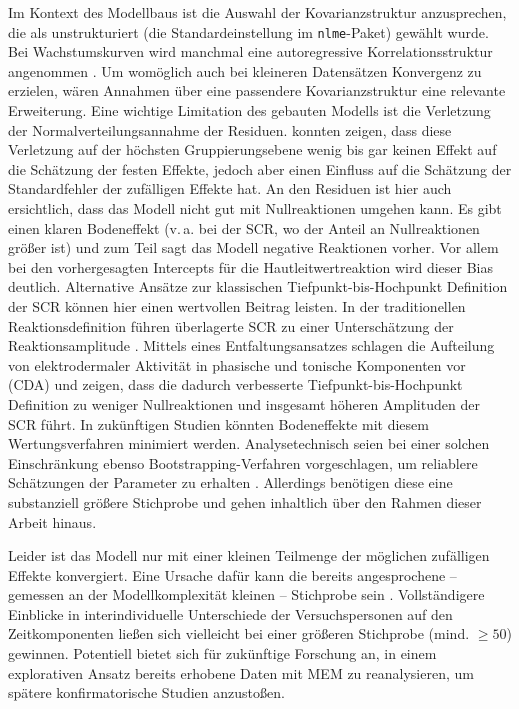 	Im Kontext des Modellbaus ist die Auswahl der Kovarianzstruktur anzusprechen, die als unstrukturiert (die Standardeinstellung im \texttt{nlme}-Paket) gewählt wurde. Bei Wachstumskurven wird manchmal eine autoregressive Korrelationsstruktur angenommen \parencite{BAGIELLA2000}. Um womöglich auch bei kleineren Datensätzen Konvergenz zu erzielen, wären Annahmen über eine passendere Kovarianzstruktur eine relevante Erweiterung.
	Eine wichtige Limitation des gebauten Modells ist die Verletzung der Normalverteilungsannahme der Residuen. %
	\textcite{MAAS2004} konnten zeigen, dass diese Verletzung auf der höchsten Gruppierungsebene wenig bis gar keinen Effekt auf die Schätzung der festen Effekte, jedoch aber einen Einfluss auf die Schätzung der Standardfehler der zufälligen Effekte hat.
	An den Residuen ist hier auch ersichtlich, dass das Modell nicht gut mit Nullreaktionen umgehen kann. Es gibt einen klaren Bodeneffekt (v.\,a. bei der SCR, wo der Anteil an Nullreaktionen größer ist) und zum Teil sagt das Modell negative Reaktionen vorher. Vor allem bei den vorhergesagten Intercepts für die Hautleitwertreaktion wird dieser Bias deutlich. 
	Alternative Ansätze zur klassischen Tiefpunkt-bis-Hochpunkt Definition der SCR können hier einen wertvollen Beitrag leisten. In der traditionellen Reaktionsdefinition führen überlagerte SCR zu einer Unterschätzung der Reaktionsamplitude \parencite{BENEDEK2010}. 
	Mittels eines Entfaltungsansatzes schlagen \textcite{BENEDEK2010} die Aufteilung von elektrodermaler Aktivität in phasische und tonische Komponenten vor (CDA) und zeigen, dass die dadurch verbesserte Tiefpunkt-bis-Hochpunkt Definition zu weniger Nullreaktionen und insgesamt höheren Amplituden der SCR führt. In zukünftigen Studien könnten Bodeneffekte mit diesem Wertungsverfahren minimiert werden.
	Analysetechnisch seien bei einer solchen Einschränkung ebenso Bootstrapping-Verfahren vorgeschlagen, um reliablere Schätzungen der Parameter zu erhalten \parencite{HOX2018}. Allerdings benötigen diese eine substanziell größere Stichprobe und gehen inhaltlich über den Rahmen dieser Arbeit hinaus. 
	
	Leider ist das Modell nur mit einer kleinen Teilmenge der möglichen zufälligen Effekte konvergiert. Eine Ursache dafür kann die bereits angesprochene -- gemessen an der Modellkomplexität kleinen -- Stichprobe sein \parencite{METEYARD2020}. Vollständigere Einblicke in interindividuelle Unterschiede der Versuchspersonen auf den Zeitkomponenten ließen sich vielleicht bei einer größeren Stichprobe (mind. $\geq 50$) gewinnen.
	Potentiell bietet sich für zukünftige Forschung an, in einem explorativen Ansatz bereits erhobene Daten mit MEM zu reanalysieren, um spätere konfirmatorische Studien anzustoßen. 
	
